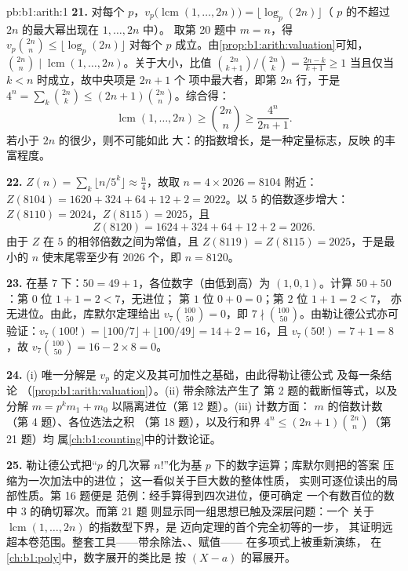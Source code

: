 \begin{solution}{pb:b1:arith:1}
\textbf{21.} 对每个 $p$，$v_p\bigl(\operatorname{lcm}(1,
\dots, 2n)\bigr) = \lfloor\log_p(2n)\rfloor$（
$p$ 的不超过 $2n$ 的最大幂出现在 $1, \dots, 2n$ 中）。
取第 20 题中 $m = n$，得 $v_p\binom{2n}n \leq \lfloor\log_p(2n)\rfloor$
对每个 $p$ 成立。由\cref{prop:b1:arith:valuation}可知，$\binom{2n}n
\mid \operatorname{lcm}(1, \dots, 2n)$。关于大小，比值
$\binom{2n}{k+1}/\binom{2n}k = \frac{2n-k}{k+1} \geq 1$ 当且仅当
$k < n$ 时成立，故中央项是 $2n + 1$ 个
项中最大者，即第 $2n$ 行，于是 $4^n = \sum_k \binom{2n}k \leq
(2n+1)\binom{2n}n$。综合得：
\[
\operatorname{lcm}(1, \dots, 2n) \geq \binom{2n}n \geq
\frac{4^n}{2n + 1} .
\]
若小于 $2n$ 的很少，则不可能如此
大：的指数增长，是一种定量标志，反映
的丰富程度。

\textbf{22.} $Z(n) = \sum_k\lfloor n/5^k\rfloor \approx \frac
n4$，故取 $n = 4 \times 2026 = 8104$ 附近：$Z(8104) = 1620 +
324 + 64 + 12 + 2 = 2022$。以 $5$ 的倍数逐步增大：$Z(8110)
= 2024$，$Z(8115) = 2025$，且
\[
Z(8120) = 1624 + 324 + 64 + 12 + 2 = 2026 .
\]
由于 $Z$ 在 $5$ 的相邻倍数之间为常值，且 $Z(8119) =
Z(8115) = 2025$，于是最小的 $n$ 使末尾零至少有
$2026$ 个，即 $n = 8120$。

\textbf{23.} 在基 $7$ 下：$50 = 49 + 1$，各位数字（由低到高）为 $(1, 0,
1)$。计算 $50 + 50$：第 $0$ 位 $1 + 1 = 2 < 7$，无进位；
第 $1$ 位 $0 + 0 = 0$；第 $2$ 位 $1 + 1 = 2 < 7$，
亦无进位。由此，库默尔定理给出 $v_7\binom{100}{50} = 0$，即 $7 \nmid
\binom{100}{50}$。由勒让德公式亦可验证：$v_7(100!) = \lfloor 100/7
\rfloor + \lfloor 100/49 \rfloor = 14 + 2 = 16$，且 $v_7(50!) = 7
+ 1 = 8$，故 $v_7\binom{100}{50} = 16 - 2\times8 = 0$。

\textbf{24.} (i) 唯一分解是
$v_p$ 的定义及其可加性之基础，由此得勒让德公式
及每一条结论
（\cref{prop:b1:arith:valuation}）。(ii) 带余除法产生了
第 2 题的截断恒等式，以及分解 $m = p^km_1 +
m_0$ 以隔离进位（第 12 题）。(iii) 计数方面：
$m$ 的倍数计数（第 4 题）、各位选法之积
（第 18 题），以及行和界 $4^n \leq
(2n+1)\binom{2n}n$（第 21 题）均
属\cref{ch:b1:counting}中的计数论证。

\textbf{25.} 勒让德公式把“$p$ 的几次幂
$n!$”化为基 $p$ 下的数字运算；库默尔则把的答案
压缩为一次加法中的进位；
这一看似关于巨大数的整体性质，
实则可逐位读出的局部性质。第 16 题便是
范例：经手算得到四次进位，便可确定
一个有数百位的数中 $3$ 的确切幂次。而第 21 题
则显示同一组思想已触及深层问题：一个
关于 $\operatorname{lcm}(1, \dots, 2n)$ 的指数型下界，是
迈向定理的首个完全初等的一步，
其证明远超本卷范围。整套工具——带余除法、、赋值——
在多项式上被重新演练，
在\cref{ch:b1:poly}中，数字展开的类比是
按 $(X - a)$ 的幂展开。
\end{solution}
